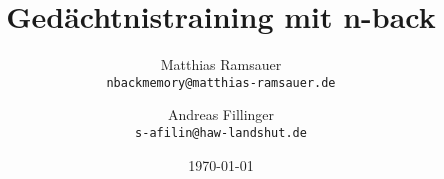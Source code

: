 


\renewcommand{\baselinestretch}{1.25}\normalsize

\title{\color{SkyBlue}\rmfamily\bfseries Gedächtnistraining mit n-back}
\author{
  Matthias Ramsauer\\
  \small\texttt{nbackmemory@matthias-ramsauer.de}
  \and
  Andreas Fillinger\\
  \small\texttt{s-afilin@haw-landshut.de}
}
\date{\today}


  \maketitle

  \tableofcontents

  
  




